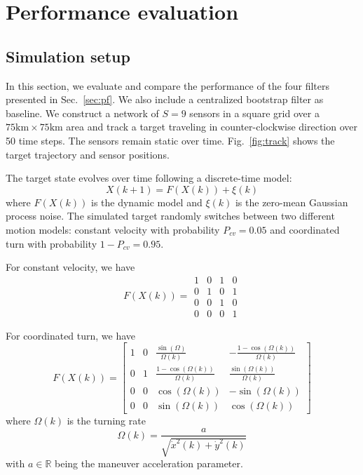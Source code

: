 \documentclass[10pt,letterpaper,final]{article}
\begin{document}
\section{Performance evaluation}
\subsection{Simulation setup}
In this section, we evaluate and compare the performance of the four filters presented in Sec.~\ref{sec:pf}. We also include a centralized bootstrap filter as baseline. We construct a network of $S=9$ sensors in a square grid over a $75\text{km} \times 75\text{km}$ area and track a target traveling in counter-clockwise direction over 50 time steps. The sensors remain static over time. Fig.~\ref{fig:track} shows the target trajectory and sensor positions. 

The target state evolves over time following a discrete-time model:
\begin{equation}
X(k+1) = F(X(k))+\xi(k)
\end{equation}
where $F(X(k))$ is the dynamic model and $\xi(k)$ is the zero-mean Gaussian process noise. The simulated target randomly switches between two different motion models: constant velocity with probability $P_{cv} = 0.05$ and coordinated turn with probability $1-P_{cv}=0.95$. 

For constant velocity, we have
\begin{equation}
F(X(k)) = 
\begin{array}{cccc}
1 & 0 & 1 & 0 \\
0 & 1 & 0 & 1 \\
0 & 0 & 1 & 0 \\
0 & 0 & 0 & 1
\end{array}
\end{equation}

For coordinated turn, we have 
\begin{equation}
F(X(k)) = 
\left[
\begin{array}{cccc}
1 & 0 & \frac{\sin(\Omega)}{\Omega (k)} & -\frac{1-\cos(\Omega (k))}{\Omega (k)} \\
0 & 1 & \frac{1-\cos(\Omega (k))}{\Omega (k)} & \frac{\sin(\Omega (k))}{\Omega (k)} \\
0 & 0 & \cos(\Omega (k)) & -\sin(\Omega (k)) \\
0 & 0 & \sin(\Omega (k)) & \cos(\Omega (k)) 
\end{array}
\right]
\end{equation}
where $\Omega (k)$ is the turning rate
\begin{equation}
\Omega (k) = \frac{a}{\sqrt{\dot{x}^2(k)+\dot{y}^2(k)}}
\end{equation}
with $a \in \mathbb{R}$ being the maneuver acceleration parameter. 
\end{document}
